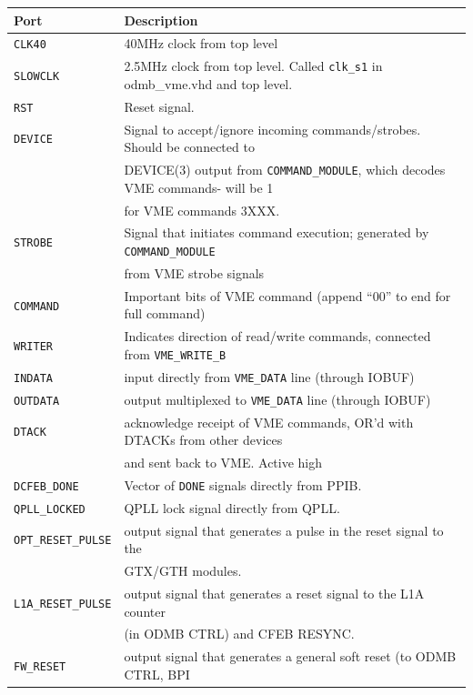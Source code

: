 \documentclass[10pt,a4paper]{article}
\begin{document}
\begin{table}[H]
\centering
\begin{tabular}{|l|l|} \hline
Port& Description\\ \hline
\texttt{CLK40}& 40MHz clock from top level\\ \hline
\texttt{SLOWCLK}& 2.5MHz clock from top level. Called \texttt{clk\_s1} in odmb\_vme.vhd and top level. \\ \hline
\texttt{RST}& Reset signal.\\ \hline
\texttt{DEVICE}& Signal to accept/ignore incoming commands/strobes. Should be connected to \\
      & DEVICE(3) output from \texttt{COMMAND\_MODULE}, which decodes VME commands- will be 1 \\
			& for VME commands 3XXX.\\ \hline 
\texttt{STROBE}& Signal that initiates command execution; generated by \texttt{COMMAND\_MODULE} \\
      & from VME strobe signals\\ \hline
\texttt{COMMAND}& Important bits of VME command (append ``00'' to end for full command)\\ \hline
\texttt{WRITER}& Indicates direction of read/write commands, connected from \texttt{VME\_WRITE\_B}\\ \hline
\texttt{INDATA}& input directly from \texttt{VME\_DATA} line (through IOBUF)\\ \hline
\texttt{OUTDATA}& output multiplexed to \texttt{VME\_DATA} line (through IOBUF)\\ \hline
\texttt{DTACK}& acknowledge receipt of VME commands, OR'd with DTACKs from other devices \\
     & and sent back to VME. Active high\\ \hline
\texttt{DCFEB\_DONE}& Vector of \texttt{DONE} signals directly from PPIB.\\ \hline
\texttt{QPLL\_LOCKED}& QPLL lock signal directly from QPLL.\\ \hline
\texttt{OPT\_RESET\_PULSE}& output signal that generates a pulse in the reset signal to the \\
                          & GTX/GTH modules.\\ \hline
\texttt{L1A\_RESET\_PULSE}& output signal that generates a reset signal to the L1A counter\\
                          & (in ODMB CTRL) and CFEB RESYNC.\\ \hline
\texttt{FW\_RESET}& output signal that generates a general soft reset (to ODMB CTRL, BPI \\

\end{tabular}
\end{table}
\end{document}
